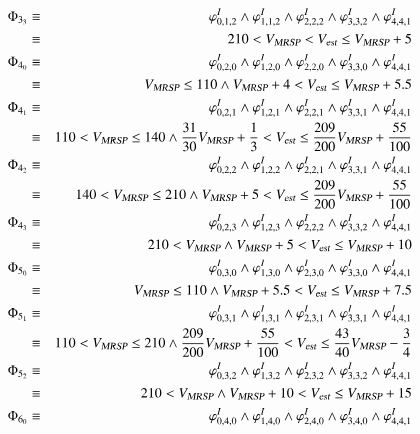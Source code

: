 \begin{example}
\begin{eqnarray*}
\Phi_{3_3} & \equiv &  \varphi_{0,1,2}^I \wedge \varphi_{1,1,2}^I \wedge  \varphi_{2,2,2}^I \wedge \varphi_{3,3,2}^I \wedge \varphi_{4,4,1}^I 
\\ & \equiv & 210 < \vmax <  \vest \le\vmax + 5 
\\
\Phi_{4_0} & \equiv &  \varphi_{0,2,0}^I \wedge \varphi_{1,2,0}^I \wedge \varphi_{2,2,0}^I \wedge  \varphi_{3,3,0}^I \wedge \varphi_{4,4,1}^I 
\\ & \equiv & \vmax \le 110 \wedge \vmax +4 < \vest \le \vmax + 5.5 
\\
\Phi_{4_1} & \equiv &  \varphi_{0,2,1}^I \wedge \varphi_{1,2,1}^I \wedge \varphi_{2,2,1}^I \wedge  \varphi_{3,3,1}^I \wedge \varphi_{4,4,1}^I 
\\ & \equiv & 110 <\vmax  \le 140 \wedge \frac{31}{30}\vmax +\frac{1}{3} < \vest \le\frac{209}{200}\vmax +\frac{55}{100}
\\
\Phi_{4_2} & \equiv &  \varphi_{0,2,2}^I \wedge \varphi_{1,2,2}^I \wedge \varphi_{2,2,1}^I \wedge  \varphi_{3,3,1}^I \wedge \varphi_{4,4,1}^I 
\\ & \equiv & 140 < \vmax \le 210 \wedge \vmax +5 < \vest \le\frac{209}{200}\vmax +\frac{55}{100}
\\
\Phi_{4_3} & \equiv &  \varphi_{0,2,3}^I \wedge \varphi_{1,2,3}^I \wedge \varphi_{2,2,2}^I \wedge  \varphi_{3,3,2}^I \wedge \varphi_{4,4,1}^I 
\\ & \equiv & 210 < \vmax  \wedge  \vmax +5 < \vest \le\vmax + 10 
\\
\Phi_{5_0} & \equiv &  \varphi_{0,3,0}^I \wedge \varphi_{1,3,0}^I \wedge \varphi_{2,3,0}^I \wedge  \varphi_{3,3,0}^I \wedge \varphi_{4,4,1}^I 
\\ & \equiv & \vmax \le 110 \wedge \vmax + 5.5 < \vest \le  \vmax + 7.5 
\\
\Phi_{5_1} & \equiv &  \varphi_{0,3,1}^I \wedge \varphi_{1,3,1}^I \wedge \varphi_{2,3,1}^I \wedge  \varphi_{3,3,1}^I \wedge \varphi_{4,4,1}^I 
\\ & \equiv & 110<\vmax \le 210 \wedge \frac{209}{200}\vmax +\frac{55}{100}< \vest \le  \frac{43}{40}\vmax -\frac{3}{4}
\\
\Phi_{5_2} & \equiv &  \varphi_{0,3,2}^I \wedge \varphi_{1,3,2}^I \wedge \varphi_{2,3,2}^I \wedge  \varphi_{3,3,2}^I \wedge \varphi_{4,4,1}^I 
\\ & \equiv & 210<\vmax   \wedge \vmax +10 < \vest \le  \vmax +15 
\\
\Phi_{6_0} & \equiv &  \varphi_{0,4,0}^I \wedge \varphi_{1,4,0}^I \wedge \varphi_{2,4,0}^I \wedge  \varphi_{3,4,0}^I \wedge \varphi_{4,4,1}^I 

\end{eqnarray*}
\end{example}
